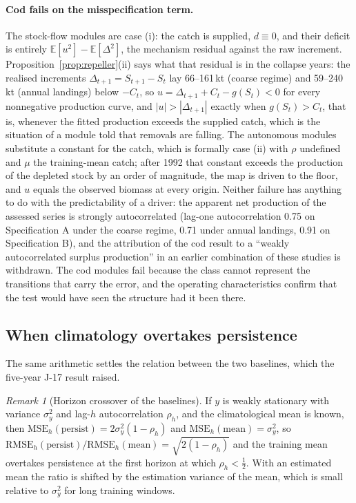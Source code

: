 \documentclass[preprint,11pt,authoryear]{elsarticle}
\theoremstyle{definition}
\theoremstyle{remark}
\newtheorem{remark}{Remark}
\newcommand{\RMSE}{\mathrm{RMSE}}
\newcommand{\MSE}{\mathrm{MSE}}
\newcommand{\pers}{\mathrm{persist}}
\newcommand{\E}{\mathbb{E}}
\begin{document}
\paragraph{Cod fails on the misspecification term.} The stock-flow modules are case (i): the catch is supplied, $d\equiv0$, and their deficit is entirely $\E[u^2]-\E[\Delta^2]$, the mechanism residual against the raw increment. Proposition~\ref{prop:repeller}(ii) says what that residual is in the collapse years: the realised increments $\Delta_{t+1}=S_{t+1}-S_t$ lay 66--161\,kt (coarse regime) and 59--240\,kt (annual landings) below $-C_t$, so $u=\Delta_{t+1}+C_t-g(S_t)<0$ for every nonnegative production curve, and $|u|>|\Delta_{t+1}|$ exactly when $g(S_t)>C_t$, that is, whenever the fitted production exceeds the supplied catch, which is the situation of a module told that removals are falling. The autonomous modules substitute a constant for the catch, which is formally case (ii) with $\rho$ undefined and $\mu$ the training-mean catch; after 1992 that constant exceeds the production of the depleted stock by an order of magnitude, the map is driven to the floor, and $u$ equals the observed biomass at every origin. Neither failure has anything to do with the predictability of a driver: the apparent net production of the assessed series is strongly autocorrelated (lag-one autocorrelation 0.75 on Specification A under the coarse regime, 0.71 under annual landings, 0.91 on Specification B), and the attribution of the cod result to a ``weakly autocorrelated surplus production'' in an earlier combination of these studies is withdrawn. The cod modules fail because the class cannot represent the transitions that carry the error, and the operating characteristics confirm that the test would have seen the structure had it been there.

\subsection{When climatology overtakes persistence}\label{sec:crossover}

The same arithmetic settles the relation between the two baselines, which the five-year J-17 result raised.

\begin{remark}[Horizon crossover of the baselines]\label{rem:crossover}
If $y$ is weakly stationary with variance $\sigma_y^2$ and lag-$h$ autocorrelation $\rho_h$, and the climatological mean is known, then $\MSE_h(\pers)=2\sigma_y^2(1-\rho_h)$ and $\MSE_h(\mathrm{mean})=\sigma_y^2$, so $\RMSE_h(\pers)/\RMSE_h(\mathrm{mean})=\sqrt{2(1-\rho_h)}$ and the training mean overtakes persistence at the first horizon at which $\rho_h<\tfrac12$. With an estimated mean the ratio is shifted by the estimation variance of the mean, which is small relative to $\sigma_y^2$ for long training windows.
\end{remark}
\end{document}
